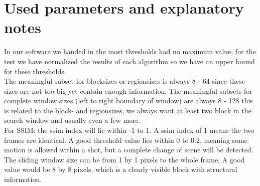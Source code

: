 \documentclass[a4paper,11pt,oneside]{article}
\begin{document}
\section{Used parameters and explanatory notes}
\vspace{-0.5cm}
In our software we handed in the most thresholds had no maximum value, for the test we have normalized the results of each algorithm so we have an upper bound for these thresholds. \\
The meaningful subset for blocksizes or regionsizes is always 8 - 64 since these sizes are not too big yet contain enough information. The meaningful subsets for complete window sizes (left to right boundary of window) are always 8 - 128 this is related to the block- and regionsizes, we always want at least two block in the search window and usually even a few more.\\
For SSIM: the ssim index will lie within -1 to 1. A ssim index of 1 means the two frames are identical. A good threshold value lies within 0 to 0.2, meaning some motion is allowed within a shot, but a complete change of scene will be detected. The sliding window size can be from 1 by 1 pixels to the whole frame. A good value would be 8 by 8 pixels, which is a clearly visible block with structural information.\\
\end{document}
